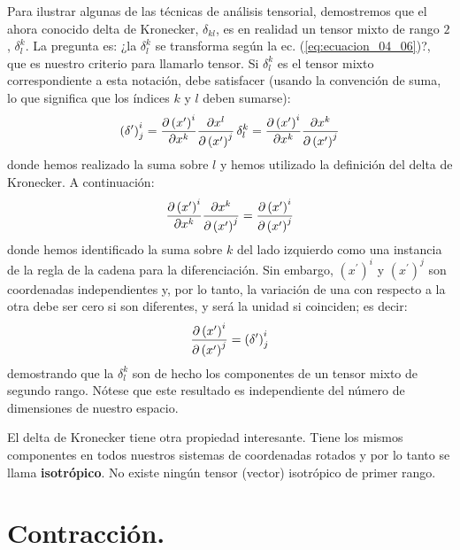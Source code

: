 \documentclass[14pt]{extarticle}
\numberwithin{equation}{section}
\begin{document}
Para ilustrar algunas de las técnicas de análisis tensorial, demostremos que el ahora conocido delta de Kronecker, $\delta_{kl}$, es en realidad un tensor mixto de rango $2$, $\delta_{l}^{k}$. La pregunta es: ¿la $\delta_{l}^{k}$ se transforma según la ec. (\ref{eq:ecuacion_04_06})?, que es nuestro criterio para llamarlo tensor. Si $\delta_{l}^{k}$ es el tensor mixto correspondiente a esta notación, debe satisfacer (usando la convención de suma, lo que significa que los índices $k$ y $l$ deben sumarse):
\begin{align*}
\left( \delta^{\prime} \right)_{j}^{i} = \pdv{\left( x^{\prime} \right)^{i}}{x^{k}} \pdv{x^{l}}{\left( x^{\prime} \right)^{j}} \, \delta_{l}^{k} = \pdv{\left( x^{\prime} \right)^{i}}{x^{k}} \pdv{x^{k}}{\left( x^{\prime} \right)^{j}}
\end{align*}
donde hemos realizado la suma sobre $l$ y hemos utilizado la definición del delta de Kronecker. A continuación:
\begin{align*}
\pdv{\left( x^{\prime} \right)^{i}}{x^{k}} \pdv{x^{k}}{\left( x^{\prime} \right)^{j}} = \pdv{\left( x^{\prime} \right)^{i}}{\left( x^{\prime} \right)^{j}}
\end{align*}
donde hemos identificado la suma sobre $k$ del lado izquierdo como una instancia de la regla de la cadena para la diferenciación. Sin embargo, $\left( x^{\prime} \right)^{i}$ y $\left( x^{\prime} \right)^{j}$ son coordenadas independientes y, por lo tanto, la variación de una con respecto a la otra debe ser cero si son diferentes, y será la unidad si coinciden; es decir:
\begin{align}
\pdv{\left( x^{\prime} \right)^{i}}{\left( x^{\prime} \right)^{j}} = \left( \delta^{\prime} \right)_{j}^{i}
\label{eq:ecuacion_04_14}
\end{align}
demostrando que la $\delta_{l}^{k}$ son de hecho los componentes de un tensor mixto de segundo rango. Nótese que este resultado es independiente del número de dimensiones de nuestro espacio.
\par
El delta de Kronecker tiene otra propiedad interesante. Tiene los mismos componentes en todos nuestros sistemas de coordenadas rotados y por lo tanto se llama \textbf{isotrópico}. No existe ningún tensor (vector) isotrópico de primer rango.

\section{Contracción.}
\end{document}
